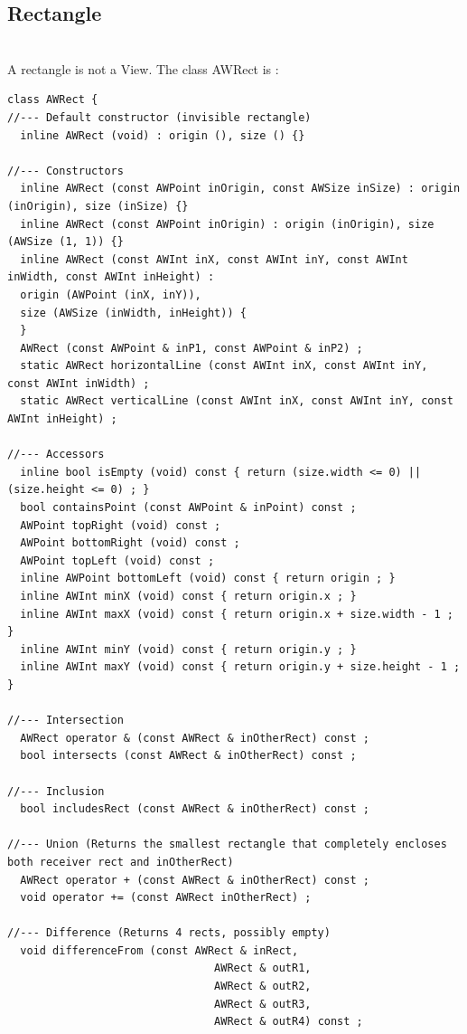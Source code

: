 \documentclass[a4paper,11pt]{extarticle}
\begin{document}
\newpage
\subsection{Rectangle}

~\\ A rectangle is not a View. The class AWRect is :

\begin{lstlisting}[language=Arduinonl]
class AWRect {
//--- Default constructor (invisible rectangle)
  inline AWRect (void) : origin (), size () {}

//--- Constructors
  inline AWRect (const AWPoint inOrigin, const AWSize inSize) : origin (inOrigin), size (inSize) {}
  inline AWRect (const AWPoint inOrigin) : origin (inOrigin), size (AWSize (1, 1)) {}
  inline AWRect (const AWInt inX, const AWInt inY, const AWInt inWidth, const AWInt inHeight) :
  origin (AWPoint (inX, inY)),
  size (AWSize (inWidth, inHeight)) {
  }
  AWRect (const AWPoint & inP1, const AWPoint & inP2) ;
  static AWRect horizontalLine (const AWInt inX, const AWInt inY, const AWInt inWidth) ;
  static AWRect verticalLine (const AWInt inX, const AWInt inY, const AWInt inHeight) ;

//--- Accessors
  inline bool isEmpty (void) const { return (size.width <= 0) || (size.height <= 0) ; }
  bool containsPoint (const AWPoint & inPoint) const ;
  AWPoint topRight (void) const ;
  AWPoint bottomRight (void) const ;
  AWPoint topLeft (void) const ;
  inline AWPoint bottomLeft (void) const { return origin ; }
  inline AWInt minX (void) const { return origin.x ; }
  inline AWInt maxX (void) const { return origin.x + size.width - 1 ; }
  inline AWInt minY (void) const { return origin.y ; }
  inline AWInt maxY (void) const { return origin.y + size.height - 1 ; }

//--- Intersection
  AWRect operator & (const AWRect & inOtherRect) const ;
  bool intersects (const AWRect & inOtherRect) const ;

//--- Inclusion
  bool includesRect (const AWRect & inOtherRect) const ;

//--- Union (Returns the smallest rectangle that completely encloses both receiver rect and inOtherRect)
  AWRect operator + (const AWRect & inOtherRect) const ;
  void operator += (const AWRect inOtherRect) ;

//--- Difference (Returns 4 rects, possibly empty)
  void differenceFrom (const AWRect & inRect,
                                AWRect & outR1,
                                AWRect & outR2,
                                AWRect & outR3,
                                AWRect & outR4) const ;


\end{lstlisting}
\end{document}

